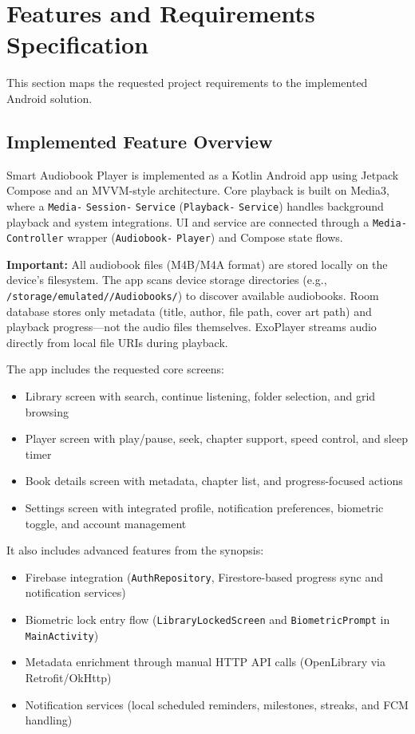 \documentclass[11pt,a4paper]{article}
\begin{document}
\section{Features and Requirements Specification}

This section maps the requested project requirements to the implemented Android solution.

\subsection{Implemented Feature Overview}

Smart Audiobook Player is implemented as a Kotlin Android app using Jetpack Compose and an MVVM-style architecture. Core playback is built on Media3, where a \texttt{Media-} \texttt{Session-} \texttt{Service} (\texttt{Playback-} \texttt{Service}) handles background playback and system integrations. UI and service are connected through a \texttt{Media-} \texttt{Controller} wrapper (\texttt{Audiobook-} \texttt{Player}) and Compose state flows.

\textbf{Important:} All audiobook files (M4B/M4A format) are stored locally on the device's filesystem. The app scans device storage directories (e.g., \texttt{/storage/\allowbreak emulated//\allowbreak Audiobooks/}) to discover available audiobooks. Room database stores only metadata (title, author, file path, cover art path) and playback progress---not the audio files themselves. ExoPlayer streams audio directly from local file URIs during playback.

The app includes the requested core screens:
\begin{itemize}[noitemsep]
    \item Library screen with search, continue listening, folder selection, and grid browsing
    \item Player screen with play/pause, seek, chapter support, speed control, and sleep timer
    \item Book details screen with metadata, chapter list, and progress-focused actions
    \item Settings screen with integrated profile, notification preferences, biometric toggle, and account management
\end{itemize}

It also includes advanced features from the synopsis:
\begin{itemize}[noitemsep]
    \item Firebase integration (\texttt{AuthRepository}, Firestore-based progress sync and notification services)
    \item Biometric lock entry flow (\texttt{LibraryLockedScreen} and \texttt{BiometricPrompt} in \texttt{MainActivity})
    \item Metadata enrichment through manual HTTP API calls (OpenLibrary via Retrofit/OkHttp)
    \item Notification services (local scheduled reminders, milestones, streaks, and FCM handling)
\end{itemize}
\end{document}
